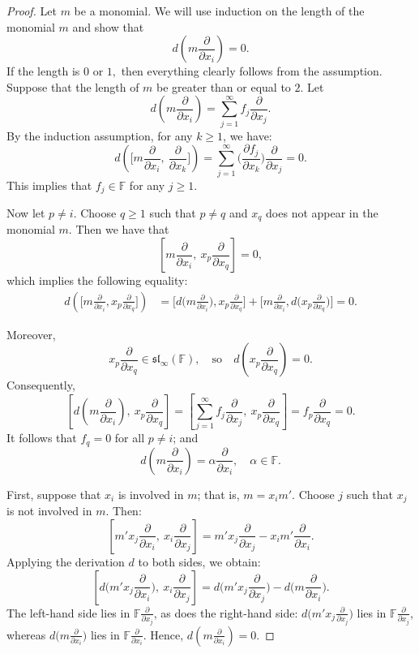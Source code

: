 \documentclass[12pt,a4paper]{amsart}
\theoremstyle{plain}
\begin{document}
	\begin{proof} Let \( m \) be a monomial. We will use induction on the length of the monomial \( m \) and show that
		\[
		d\left( m \frac{\partial}{\partial x_i} \right) = 0.
		\]  
		If the length is $0$ or $1,$ then everything clearly follows from the assumption. Suppose that  the length of \( m \) be greater than or equal to  \(  2 \).  
		Let
		\[
		d\left( m \frac{\partial}{\partial x_i} \right) = \sum_{j=1}^\infty f_j \frac{\partial}{\partial x_j}.
		\]  
		By the induction assumption, for any \( k \geq 1 \), we have:
		\[
		d\left( \Big[m \frac{\partial}{\partial x_i}, \  \frac{\partial}{\partial x_k}\Big] \right) 
		= \sum_{j=1}^\infty   \Big( \frac{\partial f_j}{\partial x_k} \Big) \frac{\partial}{\partial x_j}  = 0.
		\]  
		This implies that \( f_j \in \mathbb{F} \) for any \( j \geq 1 \).
		
		Now let \( p \neq i \). Choose \( q \geq 1 \) such that \( p \neq q \) and  \(  x_q \) does not appear  in the monomial \( m \). Then we have that 
		\[
		\left[m \frac{\partial}{\partial x_i}, \ x_p \frac{\partial}{\partial x_q}\right] = 0,
		\]
		 which implies the following equality:
		\begin{align*}
			d\left( \Big[m \frac{\partial}{\partial x_i}, x_p \frac{\partial}{\partial x_q}\Big] \right) 
			&= \Big[d\Big(m \frac{\partial}{\partial x_i}\Big),  x_p \frac{\partial}{\partial x_q}\Big] + \Big[m \frac{\partial}{\partial x_i},  d\Big(x_p \frac{\partial}{\partial x_q}\Big)\Big] = 0.
		\end{align*}
		
		Moreover, 
		\[ x_p \frac{\partial}{\partial x_q} \in \mathfrak{sl}_\infty(\mathbb{F}),
		\quad \text{so} \quad d\left(x_p \frac{\partial}{\partial x_q}\right) = 0.
		\]
		Consequently, 
		\[
		\left[d\left(m \frac{\partial}{\partial x_i}\right), \ x_p \frac{\partial}{\partial x_q}\right] = \left[ \sum_{j=1}^{\infty} f_j \frac{\partial}{\partial x_j}, \ x_p \frac{\partial}{\partial x_q} \right] =  f_p \frac{\partial}{\partial x_q}=0.
		\]
		It follows that \( f_q = 0 \) for all $p\not= i$; and  
		\[
		d\left( m \frac{\partial}{\partial x_i} \right) = \alpha \frac{\partial}{\partial x_i}, \quad \alpha \in \mathbb{F}.
		\]
		
		First, suppose that \( x_i \) is involved in \( m \); that is, \( m = x_i m' \).  
		Choose \( j \) such that \( x_j \) is not involved in \( m \). Then:
		\[
		\left[m' x_j \frac{\partial}{\partial x_i}, \ x_i \frac{\partial}{\partial x_j}\right] 
		= m' x_j \frac{\partial}{\partial x_j} - x_i m' \frac{\partial}{\partial x_i}.
		\]
		Applying the derivation \( d \) to both sides, we obtain:
		\[
		\left[d\Big(m' x_j \frac{\partial}{\partial x_i}\Big), \ x_i \frac{\partial}{\partial x_j}\right]
		= d\Big(m' x_j \frac{\partial}{\partial x_j}\Big) - d\Big( m \frac{\partial}{\partial x_i}\Big).
		\]
		The left-hand side lies in \( \mathbb{F}  \frac{\partial}{\partial x_j} \), 
		as does the right-hand side: $d\Big(m' x_j \frac{\partial}{\partial x_j}\Big) $ lies in $ \mathbb{F}  \frac{\partial}{\partial x_j} $, whereas 
		$d\Big( m \frac{\partial}{\partial x_i}\Big)$ lies in $\mathbb{F}  \frac{\partial}{\partial x_i}.$  Hence, $
		d\left(m \frac{\partial}{\partial x_i}\right) = 0.$
		

\end{proof}
\end{document}
